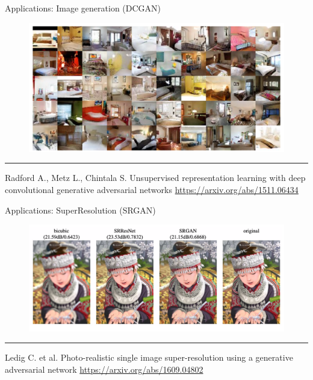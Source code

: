 \documentclass{beamer}
\begin{document}
\begin{frame}{Applications: Image generation (DCGAN)}
    \begin{figure}
        \centering
        \includegraphics[width=1.0\linewidth]{figs/dcgan.png}
        \label{fig:dcgan}
    \end{figure}
\vfill
\hrule\medskip
{\scriptsize Radford A., Metz L., Chintala S. Unsupervised representation learning with deep convolutional generative adversarial networks  \href{https://arxiv.org/abs/1511.06434}{https://arxiv.org/abs/1511.06434}}
\end{frame}
\begin{frame}{Applications: SuperResolution (SRGAN)}
    \begin{figure}
        \centering
        \includegraphics[width=1.0\linewidth]{figs/srgan.png}
        \label{fig:srgan}
    \end{figure}
\vfill
\hrule\medskip
{\scriptsize Ledig C. et al. Photo-realistic single image super-resolution using a generative adversarial network  \href{https://arxiv.org/abs/1609.04802}{https://arxiv.org/abs/1609.04802}}
\end{frame}
\end{document}
